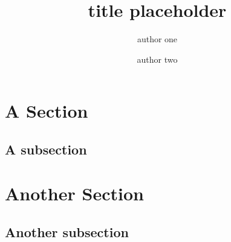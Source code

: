 \documentclass[graybox]{svmult}
\begin{document}
\title*{title placeholder}
%
%
\author{author one \and author two}

\maketitle

\abstract{\blindtext}


\section{A Section}
\Blindtext[2][3]

\subsection{A subsection} 
\blindtext

\section{Another Section}
\blindtext

\subsection{Another subsection} 
\Blindtext[2][3]







\nocite{*}




\end{document}
